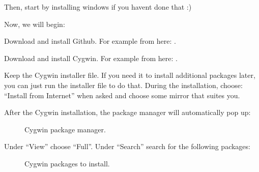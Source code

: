 \documentclass[letterpaper,10pt,english]{sphinxmanual}
\begin{document}
\begin{DUlineblock}{0em}
\item[] Then, start by installing windows if you havent done that :)
\end{DUlineblock}

\sphinxAtStartPar
Now, we will begin:

\begin{DUlineblock}{0em}
\item[] Download and install Github. For example from here:  .
\end{DUlineblock}

\begin{DUlineblock}{0em}
\item[] Download and install Cygwin. For example from here:  .
\end{DUlineblock}

\begin{DUlineblock}{0em}
\item[] Keep the Cygwin installer file. If you need it to install additional packages later, you can just run the installer file to do that. During the installation, choose: “Install from Internet” when asked and choose some mirror that suites you.
\end{DUlineblock}

\begin{DUlineblock}{0em}
\item[] After the Cygwin installation, the package manager will automatically pop up:
\end{DUlineblock}

\begin{figure}[htbp]
\centering
\capstart

\noindent{}
\caption{Cygwin package manager.}\label{\detokenize{installation:id1}}\end{figure}

\begin{DUlineblock}{0em}
\item[] Under “View” choose “Full”. Under “Search” search for the following packages:
\end{DUlineblock}

\begin{figure}[htbp]
\centering
\capstart

\noindent{}
\caption{Cygwin packages to install.}\label{\detokenize{installation:id2}}\end{figure}
\end{document}
